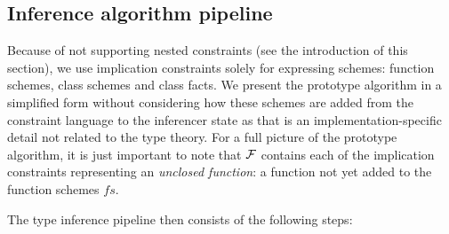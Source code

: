 \subsection{Inference algorithm pipeline}
\label{sec:inferPipeline}

Because of not supporting nested constraints (see the introduction of this section), we use implication constraints solely for expressing schemes: function schemes, class schemes and class facts. We present the prototype algorithm in a simplified form without considering how these schemes are added from the constraint language to the inferencer state as that is an implementation-specific detail not related to the type theory. For a full picture of the prototype algorithm, it is just important to note that $\mathcal F$ contains each of the implication constraints representing an \emph{unclosed function}: a function not yet added to the function schemes $fs$.

The type inference pipeline then consists of the following steps:

